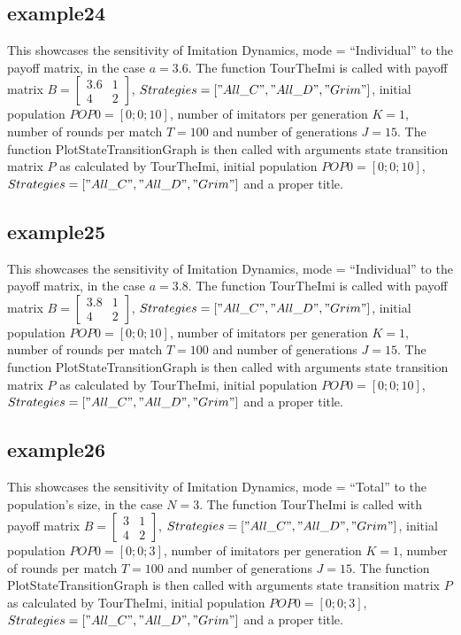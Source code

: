 \subsection{example24}
This showcases the sensitivity of Imitation Dynamics, mode = ``Individual'' to the payoff matrix, in the case $a = 3.6$. The function TourTheImi is called with payoff matrix $B = \begin{bmatrix} 3.6 & 1 \\ 4 & 2 \end{bmatrix}$, $Strategies = ["All\_C", "All\_D", "Grim"]$, initial population $POP0 = [0; 0; 10]$, number of imitators per generation $K=1$, number of rounds per match $T = 100$ and number of generations $J = 15$. The function PlotStateTransitionGraph is then called with arguments state transition matrix $P$ as calculated by TourTheImi, initial population $POP0 = [0; 0; 10]$, $Strategies = ["All\_C", "All\_D", "Grim"]$ and a proper title.

\subsection{example25}
This showcases the sensitivity of Imitation Dynamics, mode = ``Individual'' to the payoff matrix, in the case $a = 3.8$. The function TourTheImi is called with payoff matrix $B = \begin{bmatrix} 3.8 & 1 \\ 4 & 2 \end{bmatrix}$, $Strategies = ["All\_C", "All\_D", "Grim"]$, initial population $POP0 = [0; 0; 10]$, number of imitators per generation $K=1$, number of rounds per match $T = 100$ and number of generations $J = 15$. The function PlotStateTransitionGraph is then called with arguments state transition matrix $P$ as calculated by TourTheImi, initial population $POP0 = [0; 0; 10]$, $Strategies = ["All\_C", "All\_D", "Grim"]$ and a proper title.

\subsection{example26}
This showcases the sensitivity of Imitation Dynamics, mode = ``Total'' to the population's size, in the case $N=3$. The function TourTheImi is called with payoff matrix $B = \begin{bmatrix} 3 & 1 \\ 4 & 2 \end{bmatrix}$, $Strategies = ["All\_C", "All\_D", "Grim"]$, initial population $POP0 = [0; 0; 3]$, number of imitators per generation $K=1$, number of rounds per match $T = 100$ and number of generations $J = 15$. The function PlotStateTransitionGraph is then called with arguments state transition matrix $P$ as calculated by TourTheImi, initial population $POP0 = [0; 0; 3]$, $Strategies = ["All\_C", "All\_D", "Grim"]$ and a proper title.

